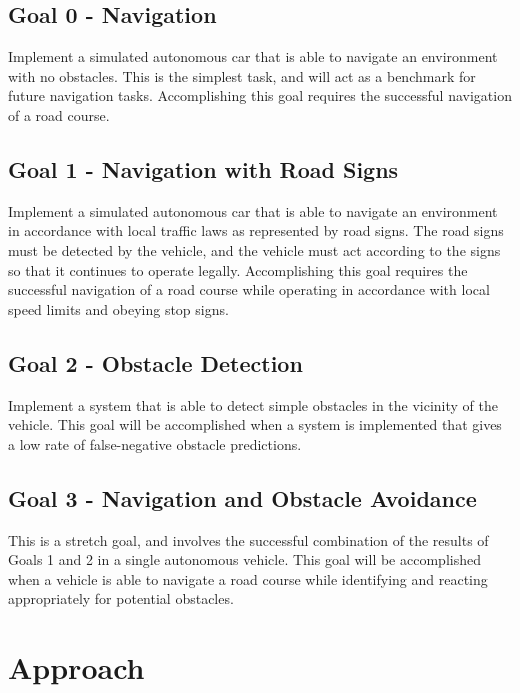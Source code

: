 \documentclass[11pt]{article}
\begin{document}
\subsection*{Goal 0 - Navigation}
Implement a simulated autonomous car that is able to navigate an environment with no obstacles.  This is the simplest task, and will act as a benchmark for future navigation tasks.  Accomplishing this goal requires the successful navigation of a road course.

\subsection*{Goal 1 - Navigation with Road Signs}
Implement a simulated autonomous car that is able to navigate an environment in accordance with local traffic laws as represented by road signs.  The road signs must be detected by the vehicle, and the vehicle must act according to the signs so that it continues to operate legally.  Accomplishing this goal requires the successful navigation of a road course while operating in accordance with local speed limits and obeying stop signs.

\subsection*{Goal 2 - Obstacle Detection}
Implement a system that is able to detect simple obstacles in the vicinity of the vehicle.  This goal will be accomplished when a system is implemented that gives a low rate of false-negative obstacle predictions.

\subsection*{Goal 3 - Navigation and Obstacle Avoidance}
This is a stretch goal, and involves the successful combination of the results of Goals 1 and 2 in a single autonomous vehicle.  This goal will be accomplished when a vehicle is able to navigate a road course while identifying and reacting appropriately for potential obstacles.

\section{Approach}
\end{document}
